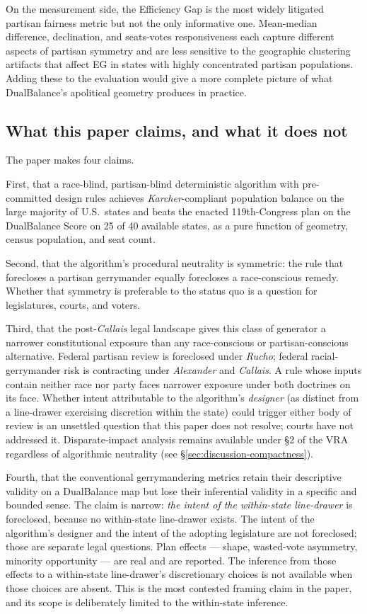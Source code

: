 On the measurement side, the Efficiency Gap is the most widely
litigated partisan fairness metric but not the only informative
one. Mean-median difference, declination, and seats-votes
responsiveness each capture different aspects of partisan symmetry
and are less sensitive to the geographic clustering artifacts that
affect EG in states with highly concentrated partisan populations.
Adding these to the evaluation would give a more complete picture
of what DualBalance's apolitical geometry produces in practice.

\subsection{What this paper claims, and what it does not}

The paper makes four claims.

First, that a race-blind, partisan-blind deterministic algorithm
with pre-committed design rules achieves \textit{Karcher}-compliant
population balance on the large majority of U.S.\ states and beats
the enacted 119th-Congress plan on the DualBalance Score on 25 of
40 available states, as a pure function of geometry, census
population, and seat count.

Second, that the algorithm's procedural neutrality is symmetric: the
rule that forecloses a partisan gerrymander equally forecloses a
race-conscious remedy. Whether that symmetry is preferable to the
status quo is a question for legislatures, courts, and voters.

Third, that the post-\textit{Callais} legal landscape gives this
class of generator a narrower constitutional exposure than any
race-conscious or partisan-conscious alternative. Federal partisan
review is foreclosed under \textit{Rucho}; federal racial-gerrymander
risk is contracting under \textit{Alexander} and \textit{Callais}.
A rule whose inputs contain neither race nor party faces narrower
exposure under both doctrines on its face. Whether intent
attributable to the algorithm's \emph{designer} (as distinct from a
line-drawer exercising discretion within the state) could trigger
either body of review is an unsettled question that this paper does
not resolve; courts have not addressed it. Disparate-impact
analysis remains available under \S2 of the VRA regardless of
algorithmic neutrality (see \S\ref{sec:discussion-compactness}).

Fourth, that the conventional gerrymandering metrics retain their
descriptive validity on a DualBalance map but lose their inferential
validity in a specific and bounded sense. The claim is narrow:
\emph{the intent of the within-state line-drawer} is foreclosed,
because no within-state line-drawer exists. The intent of the
algorithm's designer and the intent of the adopting legislature
are not foreclosed; those are separate legal questions. Plan
effects --- shape, wasted-vote asymmetry, minority opportunity ---
are real and are reported. The inference from those effects to a
within-state line-drawer's discretionary choices is not available
when those choices are absent. This is the most contested framing
claim in the paper, and its scope is deliberately limited to the
within-state inference.

